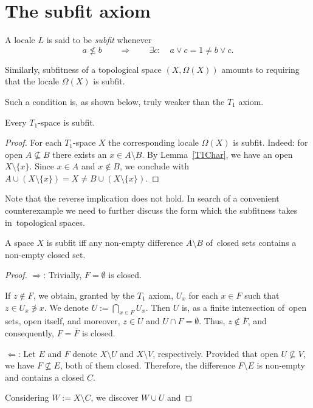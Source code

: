 \section{The subfit axiom}

\begin{df}[Sfit]
  A locale $L$ is said to be {\sl subfit\/} whenever
  \[
    a \not\le b \qquad \Rightarrow \qquad \exists c: \quad a \vee c = 1 \ne b
    \vee c.
  \]
\end{df}

Similarly, subfitness of a topological space $(X, \Omega(X))$ amounts to
requiring that the locale $\Omega(X)$ is subfit.

Such a condition is, as shown below, truly weaker than the $T_1$ axiom.

\begin{prop}
  Every $T_1$-space is subfit.
\end{prop}

\begin{proof}
  For each $T_1$-space $X$ the corresponding locale $\Omega(X)$ is subfit.
  Indeed: for open $A\not\subseteq B$ there exists an $x\in A \setminus B$.
  By Lemma~\ref{T1Char}\thinspace, we have an open $X\setminus \{x\}$.
  Since $x\in A$ and $x\not\in B$, we conclude with $A\cup (X\setminus \{x\}) =
  X \ne B \cup (X\setminus \{x\})$.
\end{proof}

Note that the reverse implication does not hold.
In search of a convenient counterexample we need to further discuss the form
which the subfitness takes in~topological spaces.

\begin{prop}
  A space $X$ is subfit iff any non-empty difference $A\setminus B$ of~closed
  sets contains a non-empty closed set.
\end{prop}

\begin{proof}
  $\Rightarrow$: Trivially, $F = \emptyset$ is closed.
  
  If $z\not\in F$, we obtain, granted by the $T_1$ axiom, $U_x$
  for each $x\in F$ such that $z\in U_x\not\owns x$.
  We denote $U := \bigcap_{x\in F}U_x$.
  Then $U$ is, as a finite intersection of~open sets, open itself, and
  moreover, $z\in U$ and $U \cap F = \emptyset$.
  Thus, $z\not\in \overline{F}$, and consequently, $F = \overline{F}$ is
  closed.

  $\Leftarrow$: Let $E$ and $F$ denote $X\setminus U$ and $X\setminus V$,
  respectively.
  Provided that open $U\not\subseteq V$, we have $F\not\subseteq E$, both
  of them closed.
  Therefore, the difference $F \setminus E$ is non-empty and contains a closed
  $C$.

  Considering $W := X \setminus C$, we discover $W \cup U$ and
\end{proof}
